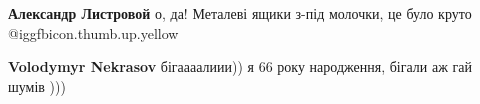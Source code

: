 \begin{itemize}
\begin{itemize}
\textbf{Александр Листровой} о, да! Металеві ящики з-під молочки, це було круто  @igg{fbicon.thumb.up.yellow} 
\end{itemize} %

\textbf{Volodymyr Nekrasov} бігаааалиии)) я 66 року народження, бігали аж гай шумів )))

\end{itemize} %
